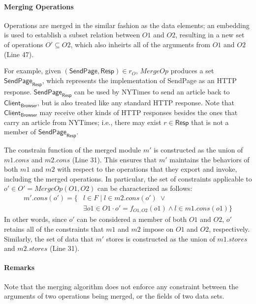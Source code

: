 \paragraph{\textbf{Merging Operations}} Operations are merged in the
similar fashion as the data elements; an embedding is used to
establish a subset relation between $O1$ and $O2$, resulting in a new
set of operations $O' \subseteq O2$, which also inheirts all of the
arguments from $O1$ and $O2$ (Line 47).

For example, given $(\textsf{SendPage}, \textsf{Resp}) \in r_{O}$,
$MergeOp$ produces a set $\textsf{SendPage}_{\textsf{Resp}}$, which
represents the implementation of \textsf{SendPage} as an HTTP
response.  $\textsf{SendPage}_{\textsf{Resp}}$ can be used by
\textsf{NYTimes} to send an article back to
$\textsf{Client}_\textsf{Browser}$, but is also treated like any
standard HTTP response. Note that $\textsf{Client}_\textsf{Browser}$
may receive other kinds of HTTP responses besides the ones that carry
an article from \textsf{NYTimes}; i.e., there may exist $r \in
\textsf{Resp}$ that is not a member of $\textsf{SendPage}_{\textsf{Resp}}$.

The constrain function of the merged module $m'$ is constructed
as the union of $m1.cons$ and $m2.cons$ (Line 31). This ensures that $m'$
maintains the behaviors of both $m1$ and $m2$ with respect to the
operations that they export and invoke, including the merged
operations. In particular, the set of constraints applicable to $o' \in O' =
MergeOp(O1, O2)$ can be characterized as follows:
\begin{align*}
m'.cons(o') = \{& l \in F \;|\; l \in m2.cons(o') \; \lor \\
&\exists o1 \in O1 
\cdot o' = f_{O1, O2}(o1) \land l \in m1.cons(o1) \} 
\end{align*}
In other words, since $o'$ can be considered a member of both $O1$ and
$O2$, $o'$ retains all of the constraints that $m1$ and $m2$ impose
on $O1$ and $O2$, respectively. Similarly, the set of data that $m'$
stores is constructed as the union of $m1.stores$ and $m2.stores$ (Line 31).



\paragraph{\textbf{Remarks}} Note that the merging algorithm
does not enforce any constraint between the arguments of two
operations being merged, or the fields of two data sets. 

